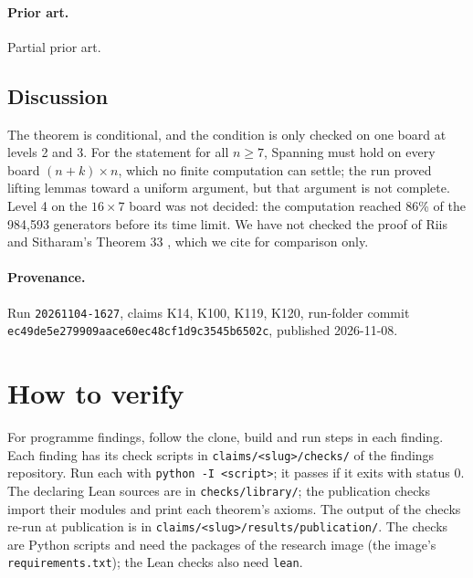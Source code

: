 \documentclass{article}
\begin{document}
\paragraph{Prior art.} Partial prior art.

\subsection*{Discussion}

The theorem is conditional, and the condition is only checked on one board at levels 2 and 3. For the
statement for all $n\ge7$, Spanning must hold on every board $(n+k)\times n$, which no finite
computation can settle; the run proved lifting lemmas toward a uniform argument, but that argument is
not complete. Level 4 on the $16\times7$ board was not decided: the computation reached 86\% of the
984,593 generators before its time limit. We have not checked the proof of Riis and Sitharam's
Theorem 33 \cite{riis1997nonconstant}, which we cite for comparison only.

\paragraph{Provenance.}
Run \texttt{20261104-1627}, claims K14, K100, K119, K120, run-folder commit \texttt{ec49de5e279909aace60ec48cf1d9c3545b6502c}, published 2026-11-08.

\section{How to verify}

For programme findings, follow the clone, build and run steps in each finding. Each finding has its check scripts in \texttt{claims/<slug>/checks/} of the findings repository. Run each with \texttt{python -I <script>}; it passes if it exits with status 0. The declaring Lean sources are in \texttt{checks/library/}; the publication checks import their modules and print each theorem's axioms. The output of the checks re-run at publication is in \texttt{claims/<slug>/results/publication/}. The checks are Python scripts and need the packages of the research image (the image's \texttt{requirements.txt}); the Lean checks also need \texttt{lean}.

\nocite{*}


\end{document}
